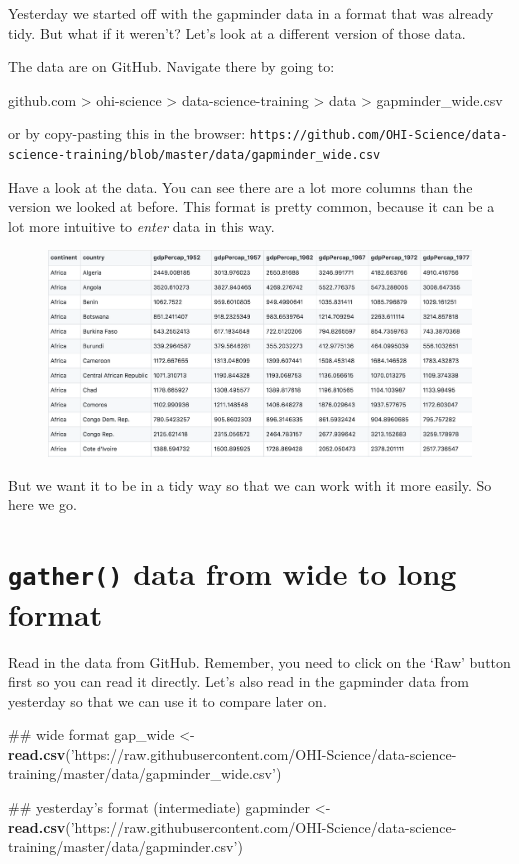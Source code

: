 \documentclass[]{book}
\newenvironment{Shaded}{\begin{snugshade}}{\end{snugshade}}
\newcommand{\KeywordTok}[1]{\textcolor[rgb]{0.13,0.29,0.53}{\textbf{#1}}}
\newcommand{\StringTok}[1]{\textcolor[rgb]{0.31,0.60,0.02}{#1}}
\newcommand{\NormalTok}[1]{#1}
\theoremstyle{definition}
\theoremstyle{definition}
\theoremstyle{definition}
\theoremstyle{remark}
\begin{document}
Yesterday we started off with the gapminder data in a format that was
already tidy. But what if it weren't? Let's look at a different version
of those data.

The data are on GitHub. Navigate there by going to:

github.com \textgreater{} ohi-science \textgreater{}
data-science-training \textgreater{} data \textgreater{}
gapminder\_wide.csv

or by copy-pasting this in the browser:
\texttt{https://github.com/OHI-Science/data-science-training/blob/master/data/gapminder\_wide.csv}

Have a look at the data. You can see there are a lot more columns than
the version we looked at before. This format is pretty common, because
it can be a lot more intuitive to \emph{enter} data in this way.

\begin{figure}
\centering
\includegraphics{img/gapminder_wide_gh.png}
\caption{}
\end{figure}

But we want it to be in a tidy way so that we can work with it more
easily. So here we go.

\section{\texorpdfstring{\texttt{gather()} data from wide to long
format}{gather() data from wide to long format}}\label{gather-data-from-wide-to-long-format}

Read in the data from GitHub. Remember, you need to click on the `Raw'
button first so you can read it directly. Let's also read in the
gapminder data from yesterday so that we can use it to compare later on.

\begin{Shaded}
\begin{Highlighting}[]
\NormalTok{## wide format}
\NormalTok{gap_wide <-}\StringTok{ }\KeywordTok{read.csv}\NormalTok{(}\StringTok{'https://raw.githubusercontent.com/OHI-Science/data-science-training/master/data/gapminder_wide.csv'}\NormalTok{)}

\NormalTok{## yesterday's format (intermediate)}
\NormalTok{gapminder <-}\StringTok{ }\KeywordTok{read.csv}\NormalTok{(}\StringTok{'https://raw.githubusercontent.com/OHI-Science/data-science-training/master/data/gapminder.csv'}\NormalTok{)}
\end{Highlighting}
\end{Shaded}
\end{document}
